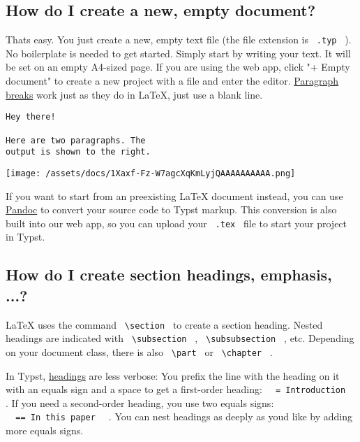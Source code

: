 \subsection{How do I create a new, empty
document?}\label{getting-started}

That\textquotesingle s easy. You just create a new, empty text file (the
file extension is \texttt{\ .typ\ } ). No boilerplate is needed to get
started. Simply start by writing your text. It will be set on an empty
A4-sized page. If you are using the web app, click "+ Empty document" to
create a new project with a file and enter the editor.
\href{/docs/reference/model/parbreak/}{Paragraph breaks} work just as
they do in LaTeX, just use a blank line.

\begin{verbatim}
Hey there!

Here are two paragraphs. The
output is shown to the right.
\end{verbatim}

\texttt{[image: /assets/docs/1Xaxf-Fz-W7agcXqKmLyjQAAAAAAAAAA.png]}

If you want to start from an preexisting LaTeX document instead, you can
use \href{https://pandoc.org}{Pandoc} to convert your source code to
Typst markup. This conversion is also built into our web app, so you can
upload your \texttt{\ .tex\ } file to start your project in Typst.

\subsection{How do I create section headings, emphasis,
...?}\label{elements}

LaTeX uses the command \texttt{\ \textbackslash{}section\ } to create a
section heading. Nested headings are indicated with
\texttt{\ \textbackslash{}subsection\ } ,
\texttt{\ \textbackslash{}subsubsection\ } , etc. Depending on your
document class, there is also \texttt{\ \textbackslash{}part\ } or
\texttt{\ \textbackslash{}chapter\ } .

In Typst, \href{/docs/reference/model/heading/}{headings} are less
verbose: You prefix the line with the heading on it with an equals sign
and a space to get a first-order heading:
\texttt{\ }{\texttt{\ =\ Introduction\ }}\texttt{\ } . If you need a
second-order heading, you use two equals signs:
\texttt{\ }{\texttt{\ ==\ In\ this\ paper\ }}\texttt{\ } . You can nest
headings as deeply as you\textquotesingle d like by adding more equals
signs.

